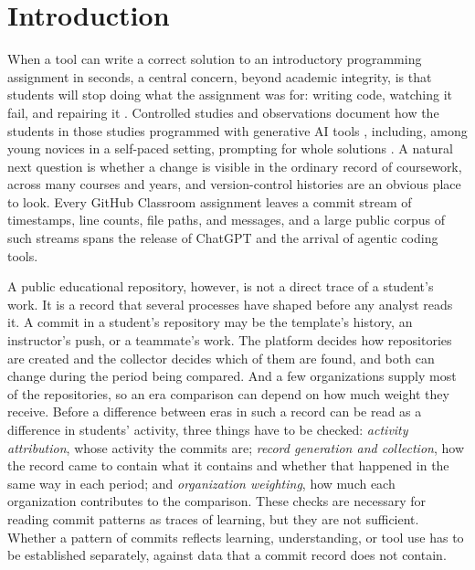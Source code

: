 \documentclass[acmsmall,screen,review,anonymous]{acmart}
\begin{document}

\maketitle
{}

\section{Introduction}
\label{sec:intro}

When a tool can write a correct solution to an introductory programming assignment in seconds, a central concern, beyond academic integrity, is that students will stop doing what the assignment was for: writing code, watching it fail, and repairing it \citep{denny2024computing, prather2024widening, finnieansley2022robots}. Controlled studies and observations document how the students in those studies programmed with generative AI tools \citep{shihab2025copilot, prather2023weird}, including, among young novices in a self-paced setting, prompting for whole solutions \citep{kazemitabaar2024novices}. A natural next question is whether a change is visible in the ordinary record of coursework, across many courses and years, and version-control histories are an obvious place to look. Every GitHub Classroom assignment leaves a commit stream of timestamps, line counts, file paths, and messages, and a large public corpus of such streams spans the release of ChatGPT and the arrival of agentic coding tools.

A public educational repository, however, is not a direct trace of a student's work. It is a record that several processes have shaped before any analyst reads it. A commit in a student's repository may be the template's history, an instructor's push, or a teammate's work. The platform decides how repositories are created and the collector decides which of them are found, and both can change during the period being compared. And a few organizations supply most of the repositories, so an era comparison can depend on how much weight they receive. Before a difference between eras in such a record can be read as a difference in students' activity, three things have to be checked: \textit{activity attribution}, whose activity the commits are; \textit{record generation and collection}, how the record came to contain what it contains and whether that happened in the same way in each period; and \textit{organization weighting}, how much each organization contributes to the comparison. These checks are necessary for reading commit patterns as traces of learning, but they are not sufficient. Whether a pattern of commits reflects learning, understanding, or tool use has to be established separately, against data that a commit record does not contain.
\end{document}
